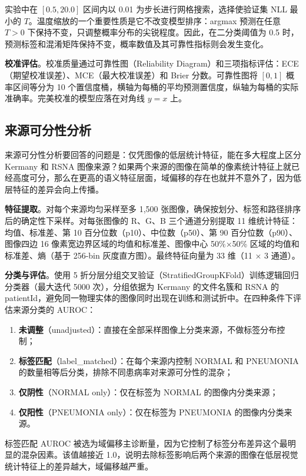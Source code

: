 \documentclass[12pt,a4paper,UTF8,openany]{ctexbook}
\begin{document}
实验中在 $[0.5, 20.0]$ 区间内以 0.01 为步长进行网格搜索，选择使验证集 NLL 最小的 $T$。温度缩放的一个重要性质是它不改变模型排序：argmax 预测在任意 $T>0$ 下保持不变，只调整概率分布的尖锐程度。因此，在二分类阈值为 0.5 时，预测标签和混淆矩阵保持不变，概率数值及其可靠性指标则会发生变化。

\textbf{校准评估}。校准质量通过可靠性图（Reliability Diagram）和三项指标评估：ECE（期望校准误差）、MCE（最大校准误差）和 Brier 分数。可靠性图将 $[0,1]$ 概率区间等分为 10 个置信度桶，横轴为每桶的平均预测置信度，纵轴为每桶的实际准确率。完美校准的模型应落在对角线 $y=x$ 上。

\subsection{来源可分性分析}

来源可分性分析要回答的问题是：仅凭图像的低层统计特征，能在多大程度上区分 Kermany 和 RSNA 图像来源？如果两个来源的图像在简单的像素统计特征上就已经高度可分，那么在更高的语义特征层面，域偏移的存在也就并不意外了，因为低层特征的差异会向上传播。

\textbf{特征提取}。对每个来源均匀采样至多 1,500 张图像，确保按划分、标签和路径排序后的确定性下采样。对每张图像的 R、G、B 三个通道分别提取 11 维统计特征：均值、标准差、第 10 百分位数（p10）、中位数（p50）、第 90 百分位数（p90）、图像四边 16 像素宽边界区域的均值和标准差、图像中心 50\%×50\% 区域的均值和标准差、熵（基于 256-bin 灰度直方图）。最终特征向量为 33 维（11 × 3 通道）。

\textbf{分类与评估}。使用 5 折分层分组交叉验证（StratifiedGroupKFold）训练逻辑回归分类器（最大迭代 5000 次），分组依据为 Kermany 的文件名簇和 RSNA 的 patientId，避免同一物理实体的图像同时出现在训练和测试折中。在四种条件下评估来源分类的 AUROC：
\begin{enumerate}[label=(\arabic*)]
  \item \textbf{未调整}（unadjusted）：直接在全部采样图像上分类来源，不做标签分布控制；
  \item \textbf{标签匹配}（label\_matched）：在每个来源内控制 NORMAL 和 PNEUMONIA 的数量相等后分类，排除不同患病率对来源可分性的混杂；
  \item \textbf{仅阴性}（NORMAL only）：仅在标签为 NORMAL 的图像内分类来源；
  \item \textbf{仅阳性}（PNEUMONIA only）：仅在标签为 PNEUMONIA 的图像内分类来源。
\end{enumerate}

标签匹配 AUROC 被选为域偏移主诊断量，因为它控制了标签分布差异这个最明显的混杂因素。该值越接近 1.0，说明去除标签影响后两个来源的图像在低层视觉统计特征上的差异越大，域偏移越严重。
\end{document}
